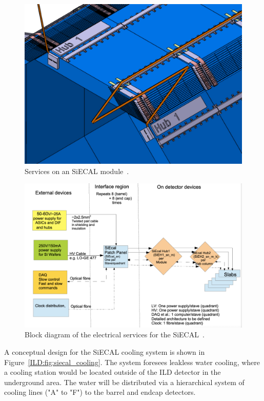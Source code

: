 \begin{figure}[h!]
    \centering
        \includegraphics[width=0.6\hsize]{Integration/fig/SiECAL_Services_v2.pdf}
    \caption{Services on an SiECAL module~\cite{ild:bib:SiECAL_ICD}.}
    \label{ILD:fig:siecal_services}
\end{figure}

\begin{figure}[h!]
    \centering
        \includegraphics[width=0.8\hsize]{Integration/fig/SiECAL_Block_Diagram_v2.pdf}
    \caption{Block diagram of the electrical services for the SiECAL~\cite{ild:bib:SiECAL_ICD}.}
    \label{ILD:fig:siecal_block_diagram}
\end{figure}

A conceptual design for the SiECAL cooling system is shown in Figure~\ref{ILD:fig:siecal_cooling}. The system foresees leakless water cooling, where a cooling station would be located outside of the ILD detector in the underground area. The water will be distributed via a hierarchical system of cooling lines ("A" to "F") to the barrel and endcap detectors.

